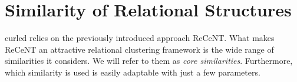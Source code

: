 \section{Similarity of Relational Structures}
\label{sec:Clustering}


\gls{curled} relies on the previously introduced approach ReCeNT.
What makes ReCeNT an attractive relational clustering framework is the wide range of similarities it considers.
We will refer to them as \textit{core similarities}.
Furthermore, which similarity is used is easily adaptable with just a few parameters.









